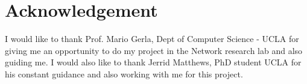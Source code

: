 \documentclass[conference]{IEEEtran}
\begin{document}
\section{Acknowledgement}
I would like to thank Prof. Mario Gerla, Dept of Computer Science - UCLA for giving me an opportunity to do my project in the Network research lab and also guiding me. I would also like to thank Jerrid Matthews, PhD student UCLA for his constant guidance and also working with me for this project.


\end{document}
